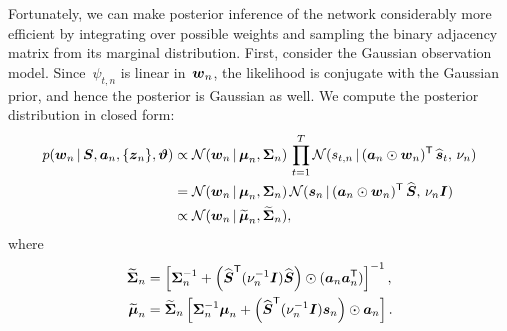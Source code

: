 Fortunately, we can make posterior inference of the network
considerably more efficient by integrating over possible weights and
sampling the binary adjacency matrix from its marginal distribution.
First, consider the Gaussian observation model.  Since~$\psi_{t,n}$ is
linear in~$\boldsymbol{w}_n$, the likelihood is conjugate with the Gaussian
prior, and hence the posterior is Gaussian as well. We compute the
posterior distribution in closed form:
\begin{align}
  \nonumber
  p(\boldsymbol{w}_n \,|\, \boldsymbol{S}, \boldsymbol{a}_n, \{\boldsymbol{z}_n\}, \boldsymbol{\vartheta})
  &\propto
  \mathcal{N}(\boldsymbol{w}_n \,|\, \boldsymbol{\mu}_n, \boldsymbol{\Sigma}_n) \,
  \prod_{t=1}^T \mathcal{N}(s_{t,n} \,|\, (\boldsymbol{a}_n \odot \boldsymbol{w}_n)^{\mathsf{T}} \, \widehat{\boldsymbol{s}}_t, \, \nu_n) \\
  \nonumber
  &= \mathcal{N}(\boldsymbol{w}_n \,|\, \boldsymbol{\mu}_n, \boldsymbol{\Sigma}_n) \,
  \mathcal{N}(\boldsymbol{s}_n \,|\, (\boldsymbol{a}_n \odot \boldsymbol{w}_n)^{\mathsf{T}} \, \widehat{\boldsymbol{S}}, \, \nu_n \boldsymbol{I}) \\
  \label{eq:w_conditional}
  &\propto \mathcal{N}(\boldsymbol{w}_n \,|\, \widetilde{\boldsymbol{\mu}}_n, \widetilde{\boldsymbol{\Sigma}}_n),
\end{align}
where
\begin{align*}
  \widetilde{\boldsymbol{\Sigma}}_n &= \left[ \boldsymbol{\Sigma}_n^{-1} +
  \left(\widehat{\boldsymbol{S}}^{\mathsf{T}} (\nu_n^{-1} \boldsymbol{I}) \widehat{\boldsymbol{S}} \right) \odot (\boldsymbol{a}_n \boldsymbol{a}_n^{\mathsf{T}}) \right]^{-1}, \\
  \widetilde{\boldsymbol{\mu}}_n &= \widetilde{\boldsymbol{\Sigma}}_n \left[ \boldsymbol{\Sigma}_n^{-1} \boldsymbol{\mu}_n +
  \left(\widehat{\boldsymbol{S}}^{\mathsf{T}} (\nu_n^{-1} \boldsymbol{I})\boldsymbol{s}_n \right) \odot \boldsymbol{a}_n \right].
\end{align*}

